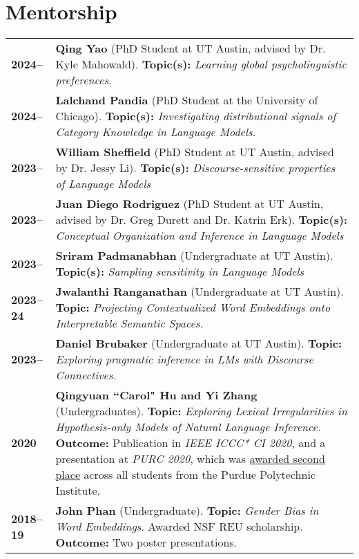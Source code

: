 \documentclass[11pt]{article}
\begin{document}
\section*{Mentorship}
\vspace{-1em}
\begin{longtable}{p{}  p{} }
    \textbf{2024--} & \textbf{Qing Yao} (PhD Student at UT Austin, advised by Dr. Kyle Mahowald). \textbf{Topic(s):} \textit{Learning global psycholinguistic preferences.}\\
    \textbf{2024--} & \textbf{Lalchand Pandia} (PhD Student at the University of Chicago). \textbf{Topic(s):} \textit{Investigating distributional signals of Category Knowledge in Language Models.}\\
    \textbf{2023--} & \textbf{William Sheffield} (PhD Student at UT Austin, advised by Dr. Jessy Li). \textbf{Topic(s):} \textit{Discourse-sensitive properties of Language Models}\\
    \textbf{2023--} & \textbf{Juan Diego Rodriguez} (PhD Student at UT Austin, advised by Dr. Greg Durett and Dr. Katrin Erk). \textbf{Topic(s):} \textit{Conceptual Organization and Inference in Language Models}\\
    \textbf{2023--} & \textbf{Sriram Padmanabhan} (Undergraduate at UT Austin). \textbf{Topic(s):} \textit{Sampling sensitivity in Language Models}\\
    \textbf{2023--24} & \textbf{Jwalanthi Ranganathan} (Undergraduate at UT Austin). \textbf{Topic:} \textit{Projecting Contextualized Word Embeddings onto Interpretable Semantic Spaces.}\\
    \textbf{2023--} & \textbf{Daniel Brubaker} (Undergraduate at UT Austin). \textbf{Topic:} \textit{Exploring pragmatic inference in LMs with Discourse Connectives.}\\
    \textbf{2020} & \textbf{Qingyuan ``Carol" Hu and Yi Zhang} (Undergraduates). \textbf{Topic:} \textit{Exploring Lexical Irregularities in Hypothesis-only Models of Natural Language Inference.} \textbf{Outcome:} Publication in \textit{IEEE ICCC* CI 2020}, and a presentation at \textit{PURC 2020}, which was \underline{awarded second place} across all students from the Purdue Polytechnic Institute.\\
    \textbf{2018--19} & \textbf{John Phan} (Undergraduate). \textbf{Topic:} \textit{Gender Bias in Word Embeddings}. Awarded NSF REU scholarship. \textbf{Outcome:} Two poster presentations.
\end{longtable}
\end{document}
